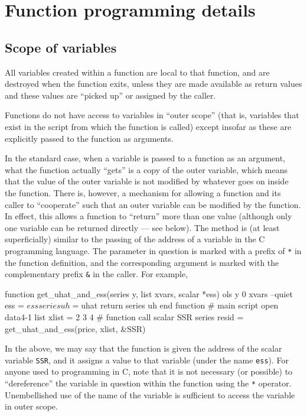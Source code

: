 
\section{Function programming details}
\label{func-details}

\subsection{Scope of variables}
\label{funscope}

All variables created within a function are local to that function,
and are destroyed when the function exits, unless they are made
available as return values and these values are ``picked up'' or
assigned by the caller.
    
Functions do not have access to variables in ``outer scope'' (that is,
variables that exist in the script from which the function is called)
except insofar as these are explicitly passed to the function as
arguments.  

In the standard case, when a variable is passed to a function as an
argument, what the function actually ``gets'' is a copy of the outer
variable, which means that the value of the outer variable is not
modified by whatever goes on inside the function.  There is, however,
a mechanism for allowing a function and its caller to ``cooperate''
such that an outer variable can be modified by the function.  In
effect, this allows a function to ``return'' more than one value
(although only one variable can be returned directly --- see below).
The method is (at least superficially) similar to the passing of the
address of a variable in the C programming language.  The parameter in
question is marked with a prefix of \texttt{*} in the function
definition, and the corresponding argument is marked with the
complementary prefix \verb+&+ in the caller.  For example,
%
\begin{code}
      function get_uhat_and_ess(series y, list xvars, scalar *ess)
        ols y 0 xvars --quiet
        ess = $ess
        series uh = $uhat
        return series uh
      end function
      # main script
      open data4-1
      list xlist = 2 3 4
      # function call
      scalar SSR
      series resid = get_uhat_and_ess(price, xlist, &SSR)
\end{code}
%
In the above, we may say that the function is given the address of
the scalar variable \texttt{SSR}, and it assigns a value to that
variable (under the name \texttt{ess}).  For anyone used to
programming in C, note that it is not necessary (or possible) to
``dereference'' the variable in question within the function using the 
\texttt{*} operator.  Unembellished use of the name of the variable is
sufficient to access the variable in outer scope.

